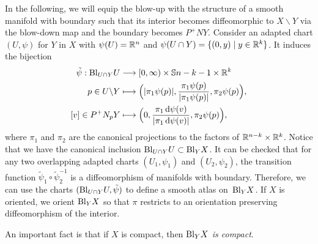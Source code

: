 \documentclass[\MainFolder/Text.tex]{subfiles}
\begin{document}
In the following, we will equip the blow-up with the structure of a smooth manifold with boundary such that its interior becomes diffeomorphic to $X\backslash Y$ via the blow-down map and the boundary becomes $P^+ NY$. Consider an adapted chart $(U,\psi)$ for $Y$ in $X$ with $\psi(U)=\mathbb{R}^{n}$ and $\psi(U\cap Y)=\{(0,y)\mid y\in \mathbb{R}^k \}$. It induces the bijection
\begin{align*}
 \tilde{\psi}: \mathrm{Bl}_{U\cap Y}U &\longrightarrow [0,\infty) \times \mathbb{S}{n-k-1} \times \mathbb{R}^k \\
  p\in U\backslash Y &\longmapsto \Bigl (|\pi_1 \psi(p)|, \frac{\pi_1\psi(p)}{|\pi_1\psi(p)|},\pi_2 \psi(p) \Bigr), \\
  [v]\in P^+N_p Y & \longmapsto \Bigl(0,\frac{\pi_1 \operatorname{d\psi}(v)}{|\pi_1 \operatorname{d\psi} (v)|},\pi_2\psi(p)\Bigr),
\end{align*}
where $\pi_1$ and $\pi_2$ are the canonical projections to the factors of $\mathbb{R}^{n-k} \times \mathbb{R}^k$. Notice that we have the canonical inclusion $\mathrm{Bl}_{U\cap Y} U \subset \mathrm{Bl}_Y X$. It can be checked that for any two overlapping adapted charts $(U_1,\psi_1)$ and $(U_2,\psi_2)$, the transition function $\tilde{\psi}_1\circ \tilde{\psi}_2^{-1}$ is a diffeomorphism of manifolds with boundary. Therefore, we can use the charts $(\mathrm{Bl}_{U\cap Y}U, \tilde{\psi})$ to define a smooth atlas on~$\mathrm{Bl}_Y X$. If $X$ is oriented, we orient $\mathrm{Bl}_Y X$ so that $\pi$ restricts to an orientation preserving diffeomorphism of the interior.

An important fact is that if $X$ is compact, then \emph{$\mathrm{Bl}_Y X$ is compact}.
\end{document}
